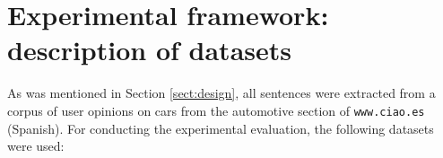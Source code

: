 \documentclass[11pt, a4paper,onecolumn]{article}
\begin{document}



\section{Experimental framework: description of datasets}
\label{sect:datasets}

As was mentioned in Section \ref{sect:design}, all sentences were extracted from a corpus of user opinions on cars from the automotive section of \texttt{www.ciao.es} (Spanish). For conducting the experimental evaluation, the following datasets were used:
\end{document}
